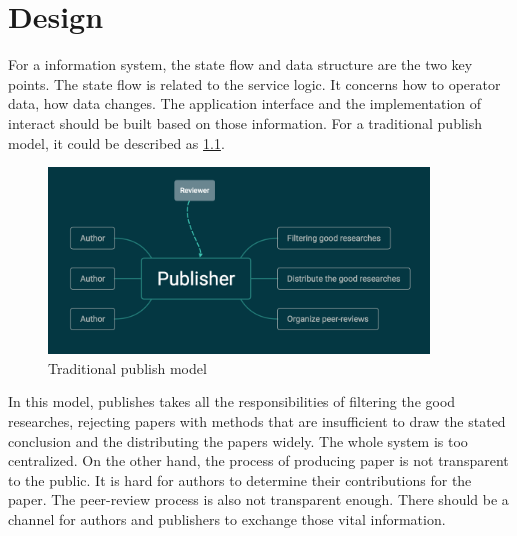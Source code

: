 \documentclass[openany,12pt]{ecsthesis}      %
\begin{document}
\chapter{Design}
For a information system, the state flow and data structure are the two key points.
The state flow is related to the service logic. It concerns how to operator data, how data changes. 
The application interface and the implementation of interact should be built based on those information.
For a traditional publish model, it could be described as \ref{model}.
\begin{figure}[H]
  \centering
  \includegraphics[width=0.9\textwidth]{traditionModel.png}
  \caption{Traditional publish model}
  \label{model}
\end{figure}
In this model, publishes takes all the responsibilities of filtering the good researches, 
rejecting papers with methods that are insufficient to draw the stated conclusion and the distributing the papers widely\cite{heller2014dynamic}. 
The whole system is too centralized. 
On the other hand, the process of producing paper is not transparent to the public. It is hard for authors to determine their contributions for the paper.
The peer-review process is also not transparent enough. There should be a channel for authors and publishers to exchange those vital information.
\end{document}
